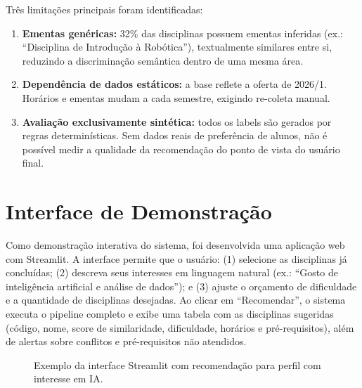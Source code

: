 \documentclass[12pt,a4paper]{article}
\begin{document}
Três limitações principais foram identificadas:

\begin{enumerate}
    \item \textbf{Ementas genéricas:} 32\% das disciplinas possuem ementas inferidas (ex.: ``Disciplina de Introdução à Robótica''), textualmente similares entre si, reduzindo a discriminação semântica dentro de uma mesma área.
    \item \textbf{Dependência de dados estáticos:} a base reflete a oferta de 2026/1. Horários e ementas mudam a cada semestre, exigindo re-coleta manual.
    \item \textbf{Avaliação exclusivamente sintética:} todos os labels são gerados por regras determinísticas. Sem dados reais de preferência de alunos, não é possível medir a qualidade da recomendação do ponto de vista do usuário final.
\end{enumerate}

\section{Interface de Demonstração}

Como demonstração interativa do sistema, foi desenvolvida uma aplicação web com Streamlit. A interface permite que o usuário: (1) selecione as disciplinas já concluídas; (2) descreva seus interesses em linguagem natural (ex.: ``Gosto de inteligência artificial e análise de dados''); e (3) ajuste o orçamento de dificuldade e a quantidade de disciplinas desejadas. Ao clicar em ``Recomendar'', o sistema executa o pipeline completo e exibe uma tabela com as disciplinas sugeridas (código, nome, score de similaridade, dificuldade, horários e pré-requisitos), além de alertas sobre conflitos e pré-requisitos não atendidos.

\begin{figure}[H]
\centering
{}
\caption{Exemplo da interface Streamlit com recomendação para perfil com interesse em IA.}
\label{fig:demo}
\end{figure}
\end{document}
